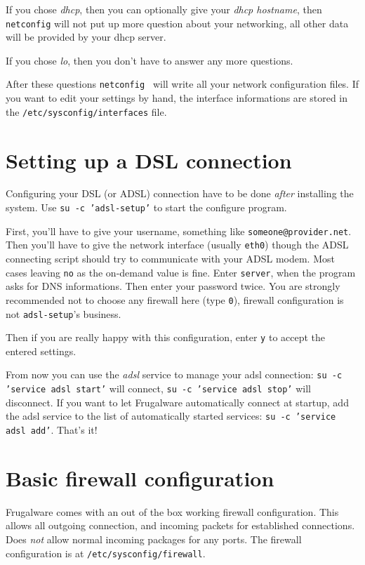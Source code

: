 If you chose \textit{dhcp}, then you can optionally give your \textit{dhcp hostname}, then {\tt netconfig} will not put up more question about your networking, all other data will be provided by your dhcp server.

If you chose \textit{lo}, then you don't have to answer any more questions.
 
After these questions {\tt netconfig } will write all your network configuration files. If you want to edit your settings by hand, the interface informations are stored in the {\tt /etc/sysconfig/interfaces} file.

\section{Setting up a DSL connection}

Configuring your DSL (or ADSL) connection have to be done \textit{after} installing the system. Use {\tt su -c 'adsl-setup'} to start the configure program.

First, you'll have to give your username, something like {\tt someone@provider.net}. Then you'll have to give the network interface (usually {\tt eth0}) though the ADSL connecting script should try to communicate with your ADSL modem. Most cases leaving {\tt no} as the on-demand value is fine. Enter {\tt server}, when the program asks for DNS informations. Then enter your password twice. You are strongly recommended not to choose any firewall here (type {\tt 0}), firewall configuration is not {\tt adsl-setup}'s business.

Then if you are really happy with this configuration, enter {\tt y} to accept the entered settings.

From now you can use the \textit{adsl} service to manage your adsl connection: {\tt su -c 'service adsl start'} will connect, {\tt su -c 'service adsl stop'} will disconnect. If you want to let Frugalware automatically connect at startup, add the adsl service to the list of automatically started services: {\tt su -c 'service adsl add'}. That's it!

\section{Basic firewall configuration}

Frugalware comes with an out of the box working firewall configuration. This allows all outgoing connection, and incoming packets for established connections. Does \textit{not} allow normal incoming packages for any ports. The firewall configuration is at {\tt /etc/sysconfig/firewall}.

